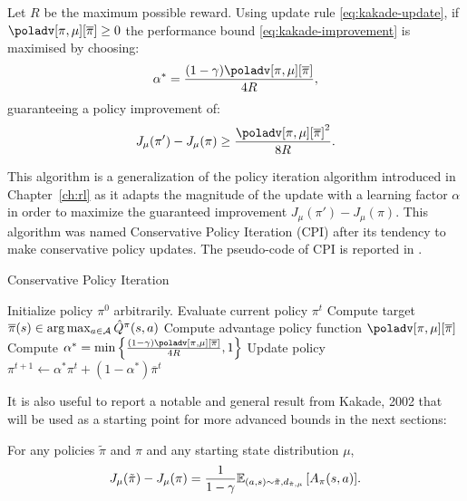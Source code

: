 \begin{theorem}
Let $R$ be the maximum possible reward. Using update rule \ref{eq:kakade-update}, if $\poladv[\pi, \mu][\overline{\pi}] \geq 0$ the performance bound \ref{eq:kakade-improvement} is maximised by choosing:
\begin{equation}
\alpha^* = \frac{(1-\gamma)\poladv[\pi, \mu][\overline{\pi}]}{4R},
\end{equation}
guaranteeing a policy improvement of:
\begin{equation}
J_{\mu}(\pi') - J_{\mu}(\pi) \geq \frac{{\poladv[\pi, \mu][\overline{\pi}]}^2}{8R}.
\end{equation}
\end{theorem}

This algorithm is a generalization of the policy iteration algorithm introduced in Chapter~\ref{ch:rl} as it adapts the magnitude of the update with a learning factor $\alpha$ in order to maximize the guaranteed improvement $J_\mu(\pi') - J_\mu(\pi)$. This algorithm was named Conservative Policy Iteration (CPI) after its tendency to make conservative policy updates. The pseudo-code of CPI is reported in . 

\begin{algorithm}[t]
\caption{Conservative Policy Iteration}\label{alg:kakade}
\begin{algorithmic}
\State Initialize policy $\pi^0$ arbitrarily.
\State Evaluate current policy $\pi^t$
\State Compute target $\overline{\pi}(s)\in\arg\max_{a\in\aspace}{\hat{Q}^\pi (s,a)}$
\State Compute advantage policy function $\poladv[\pi,\mu][\overline{\pi}]$
\State Compute $\alpha^* = \min\left\{ \frac{(1-\gamma)\poladv[\pi, \mu][\overline{\pi}]}{4R}, 1 \right\}$
\State Update policy $\pi^{t+1} \gets \alpha^* \pi^t + (1 - \alpha^*)\overline{\pi}^t$
\EndFor
\end{algorithmic}
\end{algorithm}

It is also useful to report a notable and general result from Kakade, 2002 that will be used as a starting point for more advanced bounds in the next sections: 
\begin{theorem}\label{th:kakade-lemma6.1}
For any policies $\tilde{\pi}$ and $\pi$ and any starting state distribution $\mu$,
\begin{equation}
J_{\mu}(\tilde{\pi}) - J_{\mu}(\pi) = \frac{1}{1-\gamma}\EV[(a,s)\sim\tilde{\pi}, d_{\tilde{\pi}, \mu}]{A_{\pi}(s,a)}.
\end{equation} 
\end{theorem}


